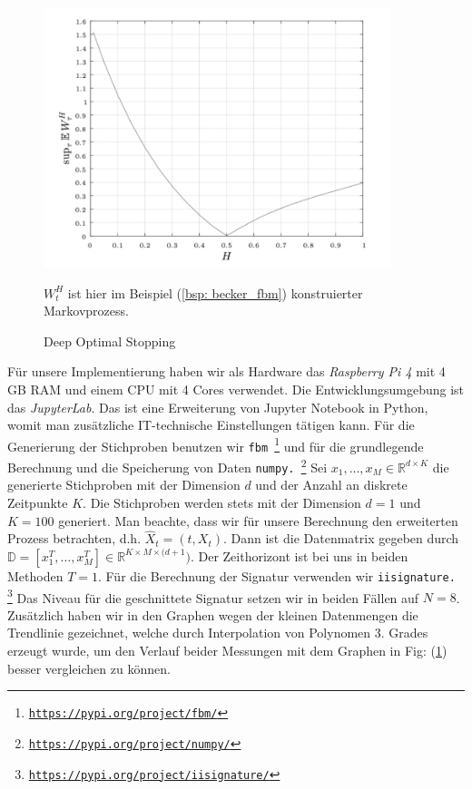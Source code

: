 \documentclass[12pt,titlepage,headsepline]{article}
\begin{document}
        \begin{figure}[H]
          \caption{Deep Optimal Stopping \cite{becker_deep_2019, Fig: 1}}
          \centering
          \includegraphics[width=0.9\textwidth]{becker_expec_vs_hurst.jpg}
          {\footnotesize
          \hfill\break
          $W_t^H$ ist hier im Beispiel (\ref{bsp: becker_fbm}) konstruierter Markovprozess.
          \par}
          \label{fig: becker_expec_vs_hurst}
        \end{figure}
        \hfill\break
        Für unsere Implementierung haben wir als Hardware das \textit{Raspberry Pi 4} mit 4 GB RAM und einem CPU mit 4 Cores verwendet. Die Entwicklungsumgebung ist das \textit{JupyterLab}. Das ist eine Erweiterung von Jupyter Notebook in Python, womit man zusätzliche IT-technische Einstellungen tätigen kann. Für die Generierung der Stichproben benutzen wir \texttt{fbm \footnote{\url{https://pypi.org/project/fbm/}}} und für die grundlegende Berechnung und die Speicherung von Daten \texttt{numpy. \footnote{\url{https://pypi.org/project/numpy/}}}
        \hfill\break
        Sei $x_1,\ldots,x_M \in \mathbb{R}^{d \times K}$ die generierte Stichproben mit der Dimension $d$ und der Anzahl an diskrete Zeitpunkte $K$. Die Stichproben werden stets mit der Dimension $d=1$ und $K=100$ generiert. Man beachte, dass wir für unsere Berechnung den erweiterten Prozess betrachten, d.h. $\hat{X}_t = (t,X_t)$. Dann ist die Datenmatrix gegeben durch
        $\mathbb{D} = [x_1^T,\ldots,x_M^T] \in \mathbb{R}^{K \times M \times ({d+1}})$. Der Zeithorizont ist bei uns in beiden Methoden $T=1$. Für die Berechnung der Signatur verwenden wir \texttt{iisignature. \footnote{\url{https://pypi.org/project/iisignature/}}} Das Niveau für die geschnittete Signatur setzen wir in beiden Fällen auf $N=8$. Zusätzlich haben wir in den Graphen wegen der kleinen Datenmengen die Trendlinie gezeichnet, welche durch Interpolation von Polynomen $3.$ Grades erzeugt wurde, um den Verlauf beider Messungen mit dem Graphen in Fig: (\ref{fig: becker_expec_vs_hurst}) besser vergleichen zu können.
\end{document}
